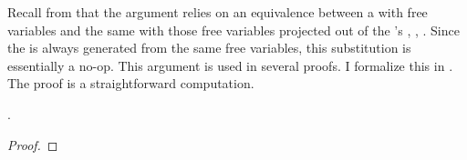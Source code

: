Recall from  that the 
argument relies on an equivalence between a  \im{\pccA} with free
variables \im{\pccxi\dots} and the same  with those free variables
projected out of the 's 
\im{\pccnpaire{\pccxi\dots}}, \ie,
\im{\pccA \equiv \subst{\pccA}{\pccnpaire{\pccxi\dots}}{\pccnpaire{\pccxi\dots}}}.
Since the  is always generated from the same free variables,
this substitution is essentially a no-op.
This argument is used in several proofs.
I formalize this  in .
The proof is a straightforward computation.
\begin{lemma}
  \label{lem:param-cc:cc:env-id}
  \im{\pccequivjudg{\pcclenv,\pccn=\pccnpaire{\pccxi\dots}:\pccApr}{(\pcclete{\pccnpaire{\pccxi\dots}}{\pccn}{\pcce})}{\pcce}}.
\end{lemma}
\begin{proof}
\end{proof}

